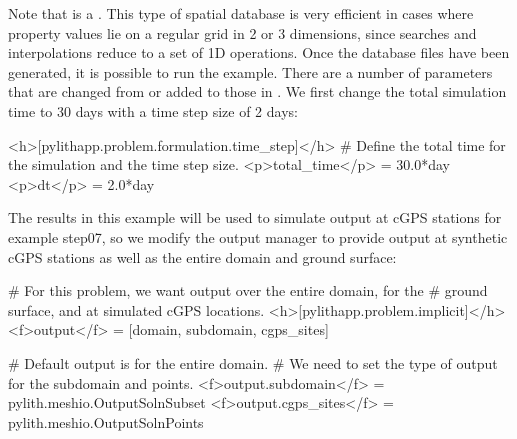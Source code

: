 Note that  is a
. This type of spatial database is very
efficient in cases where property values lie on a regular grid in 2 or
3 dimensions, since searches and interpolations reduce to a set of 1D
operations. Once the database files have been generated, it is
possible to run the example. There are a number of parameters that are
changed from or added to those in . We first
change the total simulation time to 30 days with a time step size of 2
days:
\begin{cfg}
<h>[pylithapp.problem.formulation.time_step]</h>
# Define the total time for the simulation and the time step size.
<p>total_time</p> = 30.0*day
<p>dt</p> = 2.0*day
\end{cfg}

The results in this example will be used to simulate output at cGPS
stations for example step07, so we modify the output manager to
provide output at synthetic cGPS stations as well as the entire domain
and ground surface:
\begin{cfg}
# For this problem, we want output over the entire domain, for the
# ground surface, and at simulated cGPS locations.
<h>[pylithapp.problem.implicit]</h>
<f>output</f> = [domain, subdomain, cgps_sites]

# Default output is for the entire domain.
# We need to set the type of output for the subdomain and points.
<f>output.subdomain</f> = pylith.meshio.OutputSolnSubset
<f>output.cgps_sites</f> = pylith.meshio.OutputSolnPoints
\end{cfg}

